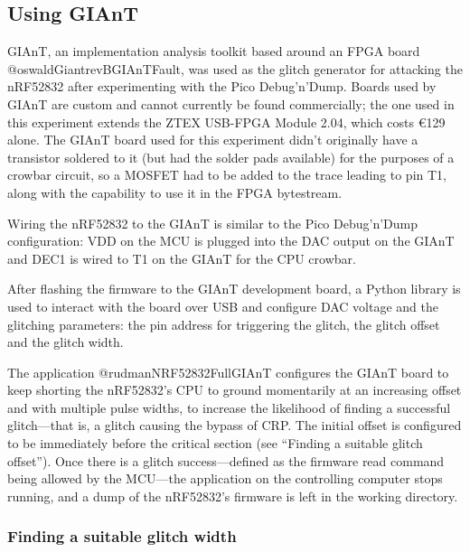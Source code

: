 \hypertarget{using-giant}{%
\subsection{\texorpdfstring{Using
GIAnT\label{section_nrf52832_giant}}{Using GIAnT}}\label{using-giant}}

GIAnT, an implementation analysis toolkit based around an FPGA board
@oswaldGiantrevBGIAnTFault, was used as the glitch generator for
attacking the nRF52832 after experimenting with the Pico Debug'n'Dump.
Boards used by GIAnT are custom and cannot currently be found
commercially; the one used in this experiment extends the ZTEX USB-FPGA
Module 2.04, which costs €129 alone. The GIAnT board used for this
experiment didn't originally have a transistor soldered to it (but had
the solder pads available) for the purposes of a crowbar circuit, so a
MOSFET had to be added to the trace leading to pin T1, along with the
capability to use it in the FPGA bytestream.

Wiring the nRF52832 to the GIAnT is similar to the Pico Debug'n'Dump
configuration: VDD on the MCU is plugged into the DAC output on the
GIAnT and DEC1 is wired to T1 on the GIAnT for the CPU crowbar.

After flashing the firmware to the GIAnT development board, a Python
library is used to interact with the board over USB and configure DAC
voltage and the glitching parameters: the pin address for triggering the
glitch, the glitch offset and the glitch width.

The application @rudmanNRF52832FullGIAnT configures the GIAnT board to
keep shorting the nRF52832's CPU to ground momentarily at an increasing
offset and with multiple pulse widths, to increase the likelihood of
finding a successful glitch---that is, a glitch causing the bypass of
CRP. The initial offset is configured to be immediately before the
critical section (see ``Finding a suitable glitch offset''). Once there
is a glitch success---defined as the firmware read command being allowed
by the MCU---the application on the controlling computer stops running,
and a dump of the nRF52832's firmware is left in the working directory.

\hypertarget{finding-a-suitable-glitch-width}{%
\subsubsection{\texorpdfstring{Finding a suitable glitch
width\label{section_nrf52832_suitable_width}}{Finding a suitable glitch width}}\label{finding-a-suitable-glitch-width}}

